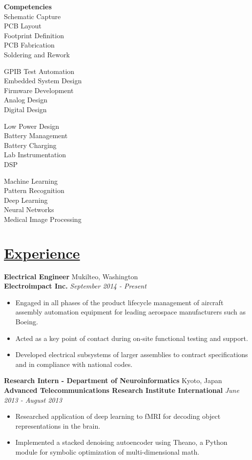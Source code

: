 \documentclass[a4paper, 11pt]{article}
\begin{document}
  \parbox{0.23\textwidth}{
    \textbf{Competencies}\\
    Schematic Capture\\
    PCB Layout\\
    Footprint Definition\\
    PCB Fabrication\\
    Soldering and Rework
  } \hfill
  \parbox{0.26\textwidth}{
    \bigskip
    GPIB Test Automation\\
    Embedded System Design\\
    Firmware Development\\
    Analog Design\\
    Digital Design
  } \hfill
  \parbox{0.21\textwidth}{
    \bigskip
    Low Power Design\\
    Battery Management\\
    Battery Charging\\
    Lab Instrumentation\\
    DSP
    } \hfill
  \parbox{0.25\textwidth}{
    \bigskip
    Machine Learning\\
    Pattern Recognition\\
    Deep Learning\\
    Neural Networks\\
    Medical Image Processing
  } \hfill
 
\section{\underline{Experience}}
  \textbf{Electrical Engineer}
  \hfill
  Mukilteo, Washington \\
  \textbf{Electroimpact Inc.}
  \hfill
  \emph{September 2014 - Present}
  \begin{itemize}[nosep]
    \item Engaged in all phases of the product lifecycle management of aircraft assembly automation equipment for leading aerospace manufacturers such as Boeing.
    \item Acted as a key point of contact during on-site functional testing and support.
    \item Developed electrical subsystems of larger assemblies to contract specifications and in compliance with national codes.
  \end{itemize}
  \medskip
  
  \textbf{Research Intern - Department of Neuroinformatics}
  \hfill
  Kyoto, Japan \\
  \textbf{Advanced Telecommunications Research Institute International}
  \hfill
  \emph{June 2013 - August 2013}
  \begin{itemize}[nosep]
    \item Researched application of deep learning to fMRI for decoding object representations in the brain.
    \item Implemented a stacked denoising autoencoder using Theano, a Python module for symbolic optimization of multi-dimensional math.
  \end{itemize}
  \medskip
  
\end{document}
